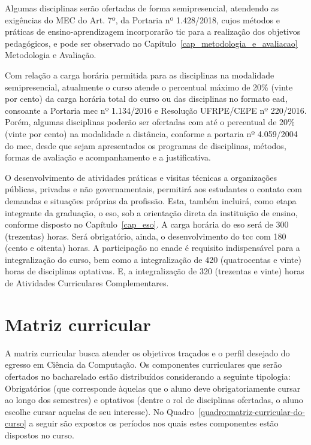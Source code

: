 \documentclass[
	12pt,				%
	openright,			%
  oneside,     %
	a4paper,			%
 hyphens,
	chapter=TITLE,		%
	english,			%
	french,				%
	spanish,			%
	brazil				%
	]{abntex2}
\begin{document}
  Algumas disciplinas serão ofertadas de forma semipresencial, atendendo as exigências do MEC do Art. 7º, da Portaria nº 1.428/2018, cujos métodos e práticas de ensino-aprendizagem incorporarão \acrfull{tic} para a realização dos objetivos pedagógicos, e pode ser observado no Capítulo~\ref{cap_metodologia_e_avaliacao} Metodologia e Avaliação.
  
  Com relação a carga horária permitida para as disciplinas na modalidade semipresencial, atualmente o curso atende o percentual máximo de 20\% (vinte por cento) da carga horária total do curso ou das disciplinas no formato \acrshort{ead}, consoante a Portaria \acrshort{mec} nº 1.134/2016 e Resolução UFRPE/CEPE nº 220/2016. Porém, algumas disciplinas poderão ser ofertadas com até o percentual de 20\% (vinte por cento) na modalidade a distância, conforme a portaria nº 4.059/2004 do \acrshort{mec}, desde que sejam apresentados os programas de disciplinas, métodos, formas de avaliação e acompanhamento e a justificativa.
  
  O desenvolvimento de atividades práticas e visitas técnicas a organizações públicas, privadas e não governamentais, permitirá aos estudantes o contato com demandas e situações próprias da profissão. Esta, também incluirá, como etapa integrante da graduação, o \acrshort{eso}, sob a orientação direta da instituição de ensino, conforme disposto no Capítulo~\ref{cap_eso}. A carga horária do \acrshort{eso} será de 300 (trezentas) horas. Será obrigatório, ainda, o desenvolvimento do \acrshort{tcc} com 180 (cento e oitenta) horas. A participação no \acrfull{enade} é requisito indispensável para a integralização do curso, bem como a integralização de 420 (quatrocentas e vinte) horas de disciplinas optativas. E, a integralização de 320 (trezentas e vinte) horas de Atividades Curriculares Complementares.
  
  \section{Matriz curricular}
  
  A matriz curricular busca atender os objetivos traçados e o perfil desejado do egresso em Ciência da Computação. Os componentes curriculares que serão ofertados no bacharelado estão distribuídos considerando a seguinte tipologia: Obrigatórios (que corresponde àquelas que o aluno deve obrigatoriamente cursar ao longo dos semestres) e optativos (dentre o rol de disciplinas ofertadas, o aluno escolhe cursar aquelas de seu interesse). No Quadro~\ref{quadro:matriz-curricular-do-curso} a seguir são expostos os períodos nos quais estes componentes estão dispostos no curso.
  
\end{document}
